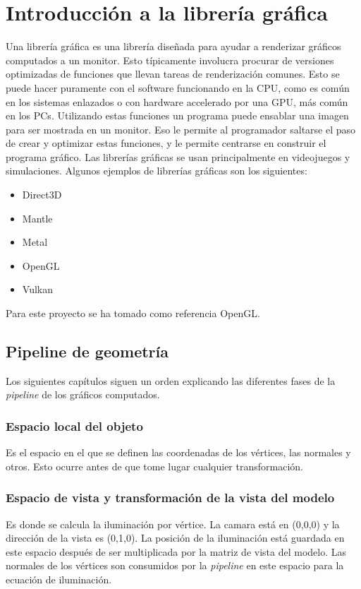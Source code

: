 \chapter{Introducción a la librería gráfica}
Una librería gráfica es una librería diseñada para ayudar a renderizar gráficos computados a un monitor. Esto típicamente involucra procurar de versiones optimizadas de funciones que llevan tareas de renderización comunes. Esto se puede hacer puramente con el software funcionando en la CPU, como es común en los sistemas enlazados o con hardware accelerado por una GPU, más común en los PCs. Utilizando estas funciones un programa puede ensablar una imagen para ser mostrada en un monitor. Eso le permite al programador saltarse el paso de crear y optimizar estas funciones, y le permite centrarse en construir el programa gráfico. Las librerías gráficas se usan principalmente en videojuegos y simulaciones.
Algunos ejemplos de librerías gráficas son los siguientes:
\begin{itemize}
\item{Direct3D}
\item{Mantle}
\item{Metal}
\item{OpenGL}
\item{Vulkan}
\end{itemize}
Para este proyecto se ha tomado como referencia OpenGL.
\section{Pipeline de geometría}
Los siguientes capítulos siguen un orden explicando las diferentes fases de la \textit{pipeline} de los gráficos computados.
\subsection{Espacio local del objeto}
Es el espacio en el que se definen las coordenadas de los vértices, las normales y otros. Esto ocurre antes de que tome lugar cualquier transformación.
\subsection{Espacio de vista y transformación de la vista del modelo}
Es donde se calcula la iluminación por vértice. La camara está en (0,0,0) y la dirección de la vista es (0,1,0). La posición de la iluminación está guardada en este espacio después de ser multiplicada por la matriz de vista del modelo. Las normales de los vértices son consumidos por la \textit{pipeline} en este espacio para la ecuación de iluminación.
